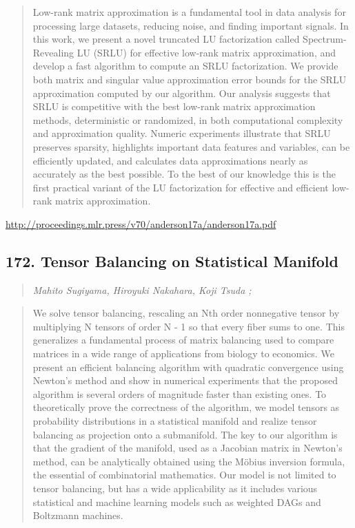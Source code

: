 \documentclass{article}
\begin{document}
\begin{quote}
    Low-rank matrix approximation is a fundamental tool in data analysis for processing large datasets, reducing noise, and finding important signals. In this work, we present a novel truncated LU factorization called Spectrum-Revealing LU (SRLU) for effective low-rank matrix approximation, and develop a fast algorithm to compute an SRLU factorization. We provide both matrix and singular value approximation error bounds for the SRLU approximation computed by our algorithm. Our analysis suggests that SRLU is competitive with the best low-rank matrix approximation methods, deterministic or randomized, in both computational complexity and approximation quality. Numeric experiments illustrate that SRLU preserves sparsity, highlights important data features and variables, can be efficiently updated, and calculates data approximations nearly as accurately as the best possible. To the best of our knowledge this is the first practical variant of the LU factorization for effective and efficient low-rank matrix approximation.  
\end{quote}

\href{http://proceedings.mlr.press/v70/anderson17a/anderson17a.pdf}{http://proceedings.mlr.press/v70/anderson17a/anderson17a.pdf}

\subsection{172. Tensor Balancing on Statistical Manifold}

\begin{quote}
\footnotesize{\textit{Mahito Sugiyama, Hiroyuki Nakahara, Koji Tsuda ;}}

\end{quote}

\begin{quote}
    We solve tensor balancing, rescaling an Nth order nonnegative tensor by multiplying N tensors of order N - 1 so that every fiber sums to one. This generalizes a fundamental process of matrix balancing used to compare matrices in a wide range of applications from biology to economics. We present an efficient balancing algorithm with quadratic convergence using Newton’s method and show in numerical experiments that the proposed algorithm is several orders of magnitude faster than existing ones. To theoretically prove the correctness of the algorithm, we model tensors as probability distributions in a statistical manifold and realize tensor balancing as projection onto a submanifold. The key to our algorithm is that the gradient of the manifold, used as a Jacobian matrix in Newton’s method, can be analytically obtained using the Möbius inversion formula, the essential of combinatorial mathematics. Our model is not limited to tensor balancing, but has a wide applicability as it includes various statistical and machine learning models such as weighted DAGs and Boltzmann machines.  
\end{quote}
\end{document}
